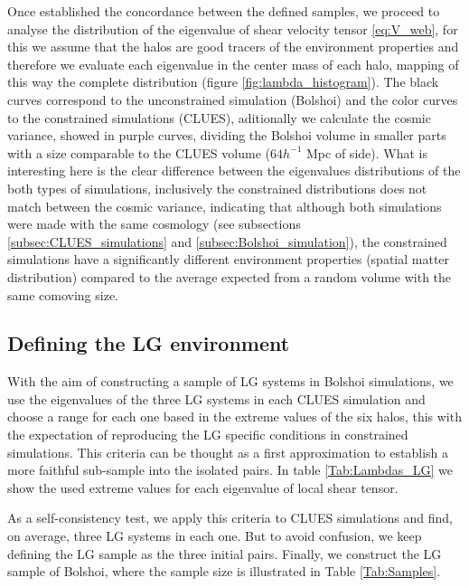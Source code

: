 \documentclass[usenatbib]{latex/mn2e}
\begin{document}
Once established the concordance between the defined samples, we proceed 
to analyse the distribution of the eigenvalue of shear velocity tensor 
\ref{eq:V_web}, for this we assume that the halos are good tracers of the 
environment properties and therefore we evaluate each eigenvalue in the 
center mass of each halo, mapping of this way the complete distribution 
(figure \ref{fig:lambda_histogram}). The black curves correspond to the 
unconstrained simulation (Bolshoi) and the color curves to the constrained 
simulations (CLUES), aditionally we calculate the cosmic variance, showed 
in purple curves, dividing the Bolshoi volume in smaller parts with a size 
comparable to the CLUES volume ($64 h^{-1 }$ Mpc of side). What is 
interesting here is the clear difference between the eigenvalues 
distributions of the both types of simulations, inclusively the 
constrained distributions does not match between the cosmic variance, 
indicating that although both simulations were made with the same cosmology 
(see subsections \ref{subsec:CLUES_simulations} and 
\ref{subsec:Bolshoi_simulation}), the constrained simulations have a 
significantly different environment properties (spatial matter distribution) 
compared to the average expected from a random volume with the same 
comoving size.


\subsection{Defining the LG environment}
\label{subsec:LG_construction}


With the aim of constructing a sample of LG systems in Bolshoi simulations, 
we use the eigenvalues of the three LG systems in each CLUES simulation 
and choose a range for each one based in the extreme values of the six 
halos, this with the expectation of reproducing the LG specific conditions 
in constrained simulations. This criteria can be thought as a first 
approximation to establish a more faithful sub-sample into the isolated 
pairs. In table \ref{Tab:Lambdas_LG} we show the used extreme values for 
each eigenvalue of local shear tensor.



As a self-consistency test, we apply this criteria to CLUES simulations 
and find, on average, three LG systems in each one. But to avoid confusion, 
we keep defining the LG sample as the three initial pairs. Finally, we 
construct the LG sample of Bolshoi, where the sample size is illustrated 
in Table \ref{Tab:Samples}.
\end{document}
